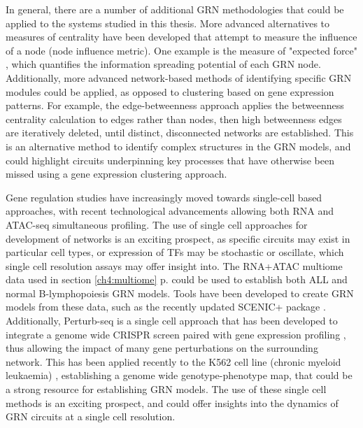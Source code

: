 In general, there are a number of additional GRN methodologies that could be applied to the systems studied in this thesis. More advanced alternatives to measures of centrality have been developed that attempt to measure the influence of a node (node influence metric). One example is the measure of "expected force" \citep{dunn_use_2005, girvan_community_2002}, which quantifies the information spreading potential of each GRN node. Additionally, more advanced network-based methods of identifying specific GRN modules could be applied, as opposed to clustering based on gene expression patterns. For example, the edge-betweenness approach applies the betweenness centrality calculation to edges rather than nodes, then high betweenness edges are iteratively deleted, until distinct, disconnected networks are established. This is an alternative method to identify complex structures in the GRN models, and could highlight circuits underpinning key processes that have otherwise been missed using a gene expression clustering approach.

Gene regulation studies have increasingly moved towards single-cell based approaches, with recent technological advancements allowing both RNA and ATAC-seq simultaneous profiling. The use of single cell approaches for development of networks is an exciting prospect, as specific circuits may exist in particular cell types, or expression of TFs may be stochastic or oscillate, which single cell resolution assays may offer insight into. The RNA+ATAC multiome data used in section \ref{ch4:multiome} p.\pageref{ch4:multiome} could be used to establish both ALL and normal B-lymphopoiesis GRN models. Tools have been developed to create GRN models from these data, such as the recently updated SCENIC+ package \citep{gonzalez-blas_scenic_2022}. Additionally, Perturb-seq is a single cell approach that has been developed to integrate a genome wide CRISPR screen paired with gene expression profiling \citep{dixit_perturb-seq_2016, }, thus allowing the impact of many gene perturbations on the surrounding network. This has been applied recently to the K562 cell line (chronic myeloid leukaemia) \citep{replogle_mapping_2022}, establishing a genome wide genotype-phenotype map, that could be a strong resource for establishing GRN models. The use of these single cell methods is an exciting prospect, and could offer insights into the dynamics of GRN circuits at a single cell resolution.








